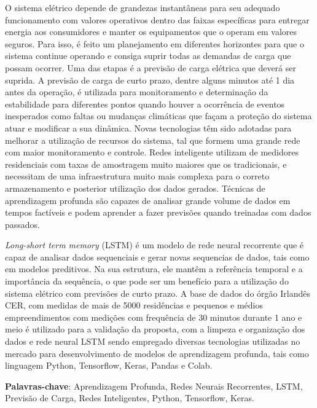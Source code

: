 \documentclass[
	12pt,				%
	oneside,			%
	a4paper,			%
	english,			%
	brazil				%
	]{abntex2}
\begin{document}
\setlength{\absparsep}{18pt} %
\begin{resumo}
	O sistema elétrico depende de grandezas instantâneas para seu adequado funcionamento com valores operativos dentro das faixas específicas para entregar energia aos consumidores e manter os equipamentos que o operam em valores seguros. Para isso, é feito um planejamento em diferentes horizontes para que o sistema continue operando e consiga suprir todas as demandas de carga que possam ocorrer. Uma das etapas é a previsão de carga elétrica que deverá ser suprida. A previsão de carga de curto prazo, dentre alguns minutos até 1 dia antes da operação, é utilizada para monitoramento e determinação da estabilidade para diferentes pontos quando houver a ocorrência de eventos inesperados como faltas ou mudanças climáticas que façam a proteção do sistema atuar e modificar a sua dinâmica. 
	Novas tecnologias têm sido adotadas para melhorar a utilização de recursos do sistema, tal que formem uma grande rede com maior monitoramento e controle. Redes inteligente utilizam de medidores residenciais com taxas de amostragem muito maiores que os tradicionais, e necessitam de uma infraestrutura muito mais complexa para o correto armazenamento e posterior utilização dos dados gerados. Técnicas de aprendizagem profunda são capazes de analisar grande volume de dados em tempos factíveis e podem aprender a fazer previsões quando treinadas com dados passados. 
	
	\textit{Long-short term memory} (LSTM) é um modelo de rede neural recorrente que é capaz de analisar dados sequenciais e gerar novas sequencias de dados, tais como em modelos preditivos. Na sua estrutura, ele mantêm a referência temporal e a importância da sequência, o que pode ser um benefício para a utilização do sistema elétrico com previsões de curto prazo. 
	A base de dados do órgão Irlandês CER, com medidas de mais de 5000 residências e pequenos e médios empreendimentos com medições com frequência de 30 minutos durante 1 ano e meio é utilizado para a validação da proposta, com a limpeza e organização dos dados e rede neural LSTM sendo empregado diversas tecnologias utilizadas no mercado para desenvolvimento de modelos de aprendizagem profunda, tais como linguagem Python, Tensorflow, Keras, Pandas e Colab. 
		
	\vspace{\onelineskip}
 
	\textbf{Palavras-chave}: Aprendizagem Profunda, Redes Neurais Recorrentes, LSTM, Previsão de Carga, Redes Inteligentes, Python, Tensorflow, Keras.
	
	
	
\end{resumo}
\end{document}
